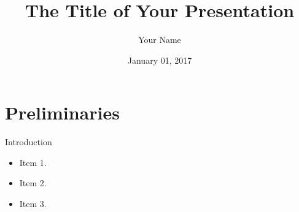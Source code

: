 \documentclass[shortpres]{beamer}
\title[Motion Planning for Autonomous Vehicles]{The Title of Your Presentation}
\author[Name]{Your Name}
\institute[TU M\"unchen]{Technische Universit\"at M\"unchen}
\date{January 01, 2017}
\begin{document}
\begin{frame}
    \titlepage
\end{frame}


\section{Preliminaries}	

\begin{frame}{Introduction}	

\begin{itemize} 
\item Item 1.
\vfill \item  Item 2.
\vfill \item  Item 3.
\end{itemize}
\end{frame}
\end{document}
